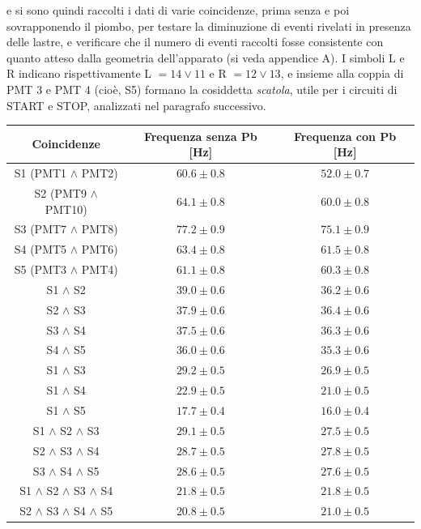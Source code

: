\documentclass[10pt, oneside, a4paper]{article}   	%
\begin{document}
%
e si sono quindi raccolti i dati di varie coincidenze, prima senza e poi sovrapponendo il piombo, per testare la diminuzione di eventi rivelati in presenza delle lastre, e verificare che il numero di eventi raccolti fosse consistente con quanto atteso dalla geometria dell'apparato (si veda appendice A). I simboli L e R indicano rispettivamente L $= 14 \vee 11 $ e R $= 12 \vee 13$, e insieme alla coppia di PMT 3 e PMT 4 (cioè, S5) formano la cosiddetta \emph{scatola}, utile per i circuiti di START e STOP, analizzati nel paragrafo successivo.
%
\begin{table}[H]
	\centering
	\begin{tabular}{ccc}
		\toprule
		Coincidenze						&	Frequenza senza Pb [Hz] & Frequenza con Pb [Hz]	\\
		\midrule
		S1 (PMT1 $\wedge$ PMT2)					& $60.6 \pm 0.8$	& $52.0 \pm 0.7$ \\
		S2 (PMT9 $\wedge$ PMT10)				& $64.1 \pm 0.8$	& $60.0 \pm 0.8$ \\
		S3 (PMT7 $\wedge$ PMT8)					& $77.2 \pm 0.9$	& $75.1 \pm 0.9$ \\
		S4 (PMT5 $\wedge$ PMT6)					& $63.4 \pm 0.8$	& $61.5 \pm 0.8$ \\
		S5 (PMT3 $\wedge$ PMT4)					& $61.1 \pm 0.8$	& $60.3 \pm 0.8$ \\
		S1 $\wedge$ S2 						& $39.0 \pm 0.6$	& $36.2 \pm 0.6$ \\
		S2 $\wedge$ S3 						& $37.9 \pm 0.6$    	& $36.4 \pm 0.6$ \\
		S3 $\wedge$ S4 						& $37.5 \pm 0.6$	& $36.3 \pm 0.6$ \\
		S4 $\wedge$ S5 						& $36.0 \pm 0.6$	& $35.3 \pm 0.6$ \\
		S1 $\wedge$ S3 						& $29.2 \pm 0.5$	& $26.9 \pm 0.5$ \\
		S1 $\wedge$ S4 						& $22.9 \pm 0.5$	& $21.0 \pm 0.5$ \\
		S1 $\wedge$ S5 						& $17.7 \pm 0.4$	& $16.0 \pm 0.4$ \\
		S1 $\wedge$ S2 $\wedge$ S3				& $29.1 \pm 0.5$	& $27.5 \pm 0.5$ \\
		S2 $\wedge$ S3 $\wedge$ S4				& $28.7 \pm 0.5$	& $27.8 \pm 0.5$ \\
		S3 $\wedge$ S4 $\wedge$ S5				& $28.6 \pm 0.5$	& $27.6 \pm 0.5$ \\
		S1 $\wedge$ S2 $\wedge$ S3 $\wedge$ S4			& $21.8 \pm 0.5$	& $21.8 \pm 0.5$ \\
		S2 $\wedge$ S3 $\wedge$ S4 $\wedge$ S5			& $20.8 \pm 0.5$	& $21.0 \pm 0.5$ \\

\end{tabular}
\end{table}
\end{document}
